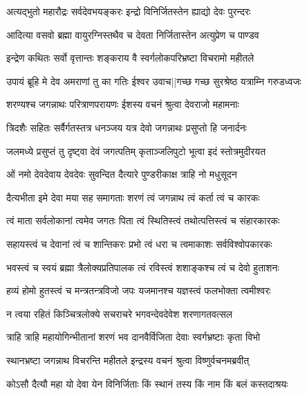 \twolineshloka
{अत्यद्भुतो महारौद्रः सर्वदेवभयङ्करः}
{इन्द्रो विनिर्जितस्तेन ह्याद्यो देवः पुरन्दरः} %

\twolineshloka
{आदित्या वसवो ब्रह्मा वायुरग्निस्तथैव च}
{देवता निर्जितास्तेन अत्युप्रेण च पाण्डव} %

\twolineshloka
{इन्द्रेण कथितः सर्वो वृत्तान्तः शङ्कराय वै}
{स्वर्गलोकपरिभ्रष्टा विचरामो महीतले} %

\twolineshloka
{उपायं ब्रूहि मे देव अमराणां तु का गतिः}
{ईश्वर उवाच||गच्छ गच्छ सुरश्रेष्ठ यत्राम्नि गरुडध्वजः} %

\twolineshloka
{शरण्यश्च जगन्नाथः परित्राणपरायणः}
{ईशस्य वचनं श्रुत्वा देवराजो महामनाः} %

\twolineshloka
{त्रिदशैः सहितः सर्वैर्गतस्तत्र धनञ्जय}
{यत्र देवो जगन्नाथः प्रसुप्तो हि जनार्दनः} %

\twolineshloka
{जलमध्ये प्रसुप्तं तु दृष्ट्वा देवं जगत्पतिम्}
{कृताञ्जलिपुटो भूत्वा इदं स्तोत्रमुदीरयत} %

\twolineshloka
{ओं नमो देवदेवाय देवदेवः सुवन्दित}
{दैत्यारे पुण्डरीकाक्ष त्राहि नो मधुसूदन} %

\twolineshloka
{दैत्यभीता इमे देवा मया सह समागताः}
{शरणं त्वं जगन्नाथ त्वं कर्ता त्वं च कारकः} %

\twolineshloka
{त्वं माता सर्वलोकानां त्वमेव जगतः पिता}
{त्वं स्थितिस्त्वं तथोत्पत्तिस्त्वं च संहारकारकः} %

\twolineshloka
{सहायस्त्वं च देवानां त्वं च शान्तिकरः प्रभो}
{त्वं धरा च त्वमाकाशः सर्वविश्वोपकारकः} %

\twolineshloka
{भवस्त्वं च स्वयं ब्रह्मा त्रैलोक्यप्रतिपालक}
{त्वं रविस्त्वं शशाङ्कश्च त्वं च देवो हुताशनः} %

\twolineshloka
{हव्यं होमो हुतस्त्वं च मन्त्रतन्त्रविजो जपः}
{यजमानश्च यज्ञस्त्वं फलभोक्ता त्वमीश्वरः} %

\twolineshloka
{न त्वया रहितं किञ्चित्रलोक्ये सचराचरे}
{भगवन्देवदेवेश शरणागतवत्सल} %

\twolineshloka
{त्राहि त्राहि महायोगिन्भीतानां शरणं भव}
{दानवैर्विजिता देवाः स्वर्गभ्रष्टाः कृता विभो} %

\twolineshloka
{स्थानभ्रष्टा जगन्नाथ विचरन्ति महीतले}
{इन्द्रस्य वचनं श्रुत्वा विष्णुर्वचनमब्रवीत्} %


\twolineshloka
{कोऽसौ दैत्यौ महा यो देवा येन विनिर्जिताः}
{किं स्थानं तस्य किं नाम किं बलं कस्तदाश्रयः} %


